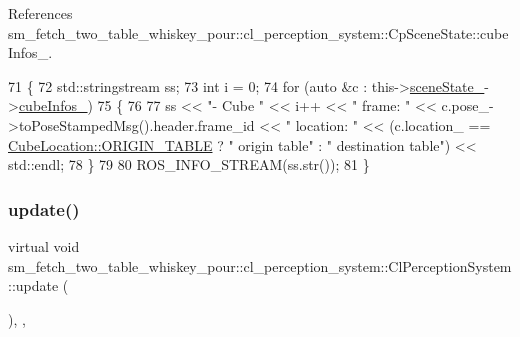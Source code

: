 References sm\+\_\+fetch\+\_\+two\+\_\+table\+\_\+whiskey\+\_\+pour\+::cl\+\_\+perception\+\_\+system\+::\+Cp\+Scene\+State\+::cube\+Infos\+\_\+.


\begin{DoxyCode}
71             \{
72                 std::stringstream ss;
73                 \textcolor{keywordtype}{int} i = 0;
74                 \textcolor{keywordflow}{for} (\textcolor{keyword}{auto} &c : this->\hyperlink{classsm__fetch__two__table__whiskey__pour_1_1cl__perception__system_1_1ClPerceptionSystem_af60dc69df392f4bb2aae7220dd0ff847}{sceneState\_}->\hyperlink{classsm__fetch__two__table__whiskey__pour_1_1cl__perception__system_1_1CpSceneState_a8106a20f8f9a385835a39f6fb2960165}{cubeInfos\_})
75                 \{
76 
77                     ss << \textcolor{stringliteral}{"- Cube "} << i++ << \textcolor{stringliteral}{" frame: "} << c.pose\_->toPoseStampedMsg().header.frame\_id << \textcolor{stringliteral}{
      " location: "} << (c.location\_ == \hyperlink{namespacesm__fetch__two__table__whiskey__pour_1_1cl__perception__system_a7523acd4abcc84c78d6a15965f9c25b9ae5ee34c3ef8ec4a46a00a218416c7b1d}{CubeLocation::ORIGIN\_TABLE} ? \textcolor{stringliteral}{" origin table"} : \textcolor{stringliteral}{"
       destination table"}) << std::endl;
78                 \}
79 
80                 ROS\_INFO\_STREAM(ss.str());
81             \}
\end{DoxyCode}
\mbox{\label{classsm__fetch__two__table__whiskey__pour_1_1cl__perception__system_1_1ClPerceptionSystem_a66a8dfad8b4403b5a0f50fecead09410}} 
\subsubsection{\texorpdfstring{update()}{update()}}
{\footnotesize\ttfamily virtual void sm\+\_\+fetch\+\_\+two\+\_\+table\+\_\+whiskey\+\_\+pour\+::cl\+\_\+perception\+\_\+system\+::\+Cl\+Perception\+System\+::update (\begin{DoxyParamCaption}{ }\end{DoxyParamCaption})\hspace{0.3cm}{\ttfamily [inline]}, {\ttfamily [override]}, {\ttfamily [virtual]}}




